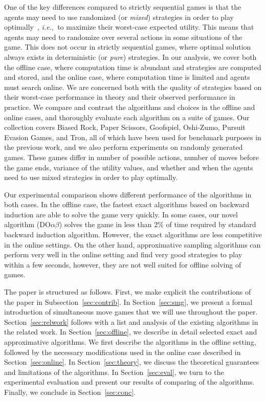 \documentclass[preprint,12pt]{elsarticle}
\newcommand{\ie}{{\it i.e.,}~}
\newcommand{\reviewchange}[1]{{\color{blue}#1}}
\newcommand{\doab}[0]{\textrm{DO}\alpha\beta}
\begin{document}
One of the key differences compared to strictly sequential 
games is that the agents may need to use randomized (or \textit{mixed}) strategies in order to 
play optimally~\cite{Gintis09}, 
\ie to maximize their worst-case expected utility.
This means that agents may need to randomize over several actions in some situations of the game. 
This does not occur in strictly sequential games, where optimal solution always exists in deterministic 
(or \textit{pure}) strategies.
In our analysis, we cover both the offline case, where computation time is 
abundant and strategies are computed and stored, and the online case, where computation time is limited and 
agents must search online. We are concerned both with the quality of strategies based on 
their worst-case performance in theory and their observed performance in practice. We compare and 
contrast the algorithms and choices in the offline and online cases, and thoroughly evaluate each 
algorithm on a suite of games. Our collection covers Biased Rock, Paper Scissors, Goofspiel, Oshi-Zumo, 
Pursuit Evasion Games, and Tron, all of which have been used for benchmark purposes
in the previous work, and we also perform experiments on randomly generated games. These games differ 
in number of possible actions, number of moves before the game ends, variance of the utility values,
and whether and when the agents need to use mixed strategies in order to play optimally.

Our experimental comparison shows different performance of the algorithms in both cases.
In the offline case, the fastest exact algorithms based on backward induction are able to solve the game very quickly. 
In some cases, our novel algorithm ($\doab$) solves the game in less than 2\% of time required by standard backward 
induction algorithm.
However, the exact algorithms are less competitive in the online settings. 
On the other hand, approximative sampling algorithms can perform very well in the online setting and 
find very good strategies to play within a few seconds, however, they are not well suited for offline solving of games. 

The paper is structured as follows. \reviewchange{First, we make explicit the contributions of the paper in Subsection~\ref{sec:contrib}.}
In Section~\ref{sec:smg}, we present a formal introduction of simultaneous move games that we will use throughout the paper. 
Section~\ref{sec:relwork} follows with a list and analysis of the existing algorithms in the related work. In 
Section~\ref{sec:offline}, we describe in detail selected exact and approximative algorithms.
We first describe the algorithms in the offline setting, followed by the necessary modifications used in the online 
case described in Section~\ref{sec:online}.
\reviewchange{In Section~\ref{sec:theory}, we discuss the theoretical guarantees and limitations of the algorithms.}
In Section~\ref{sec:eval}, we turn to the experimental evaluation and present our results of comparing of the algorithms.
Finally, we conclude in Section~\ref{sec:conc}.
\end{document}
